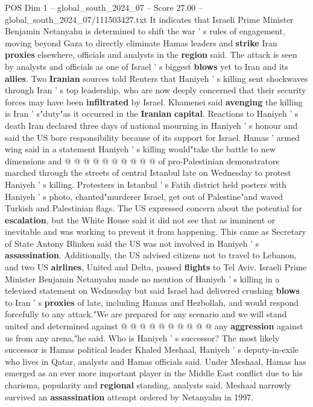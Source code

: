 \begin{textsample}{POS Dim 1 – global\_south\_2024\_07 – Score 27.00 – global\_south\_2024\_07/111503427.txt}
It indicates that Israeli Prime Minister Benjamin Netanyahu is determined to shift the war ' s rules of engagement, moving beyond Gaza to directly eliminate Hamas leaders and \textbf{strike} Iran \textbf{proxies} elsewhere, officials and analysts in the \textbf{region} said.
The attack is seen by analysts and officials as one of Israel ' s biggest \textbf{blows} yet to Iran and its \textbf{allies}.
Two \textbf{Iranian} sources told Reuters that Haniyeh ' s killing sent shockwaves through Iran ' s top leadership, who are now deeply concerned that their security forces may have been \textbf{infiltrated} by Israel.
Khamenei said \textbf{avenging} the killing is Iran ' s"duty"as it occurred in the \textbf{Iranian} \textbf{capital}.
Reactions to Haniyeh ' s death Iran declared three days of national mourning in Haniyeh ' s honour and said the US bore responsibility because of its support for Israel.
Hamas ' armed wing said in a statement Haniyeh ' s killing would"take the battle to new dimensions and @ @ @ @ @ @ @ @ @ @ of pro-Palestinian demonstrators marched through the streets of central Istanbul late on Wednesday to protest Haniyeh ' s killing.
Protesters in Istanbul ' s Fatih district held posters with Haniyeh ' s photo, chanted"murderer Israel, get out of Palestine"and waved Turkish and Palestinian flags.
The US expressed concern about the potential for \textbf{escalation}, but the White House said it did not see that as imminent or inevitable and was working to prevent it from happening.
This came as Secretary of State Antony Blinken said the US was not involved in Haniyeh ' s \textbf{assassination}.
Additionally, the US advised citizens not to travel to Lebanon, and two US \textbf{airlines}, United and Delta, paused \textbf{flights} to Tel Aviv.
Israeli Prime Minister Benjamin Netanyahu made no mention of Haniyeh ' s killing in a televised statement on Wednesday but said Israel had delivered crushing \textbf{blows} to Iran ' s \textbf{proxies} of late, including Hamas and Hezbollah, and would respond forcefully to any attack."We are prepared for any scenario and we will stand united and determined against @ @ @ @ @ @ @ @ @ @ any \textbf{aggression} against us from any arena,"he said.
Who is Haniyeh ' s successor?
The most likely successor is Hamas political leader Khaled Meshaal, Haniyeh ' s deputy-in-exile who lives in Qatar, analysts and Hamas officials said.
Under Meshaal, Hamas has emerged as an ever more important player in the Middle East conflict due to his charisma, popularity and \textbf{regional} standing, analysts said.
Meshaal narrowly survived an \textbf{assassination} attempt ordered by Netanyahu in 1997.

\end{textsample}
